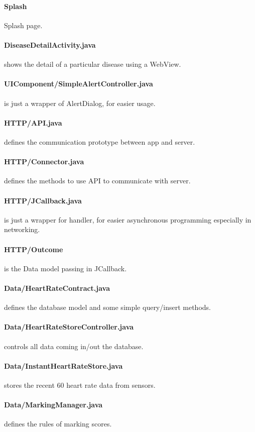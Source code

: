 \paragraph{Splash} Splash page.
\paragraph{DiseaseDetailActivity.java} shows the detail of a particular disease using a WebView.
\paragraph{UIComponent/SimpleAlertController.java} is just a wrapper of AlertDialog, for easier usage.
\paragraph{HTTP/API.java} defines the communication prototype between app and server.
\paragraph{HTTP/Connector.java} defines the methods to use API to communicate with server.
\paragraph{HTTP/JCallback.java} is just a wrapper for handler, for easier asynchronous programming especially in networking.
\paragraph{HTTP/Outcome} is the Data model passing in JCallback.
\paragraph{Data/HeartRateContract.java} defines the database model and some simple query/insert methods.
\paragraph{Data/HeartRateStoreController.java} controls all data coming in/out the database.
\paragraph{Data/InstantHeartRateStore.java} stores the recent 60 heart rate data from sensors.
\paragraph{Data/MarkingManager.java} defines the rules of marking scores.
